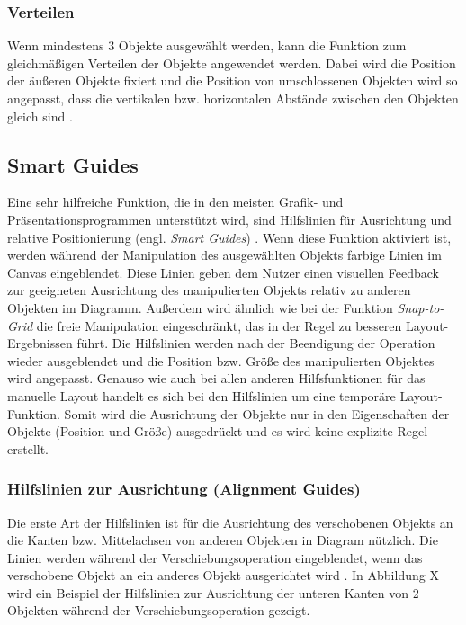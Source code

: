 
\subsubsection{Verteilen}

Wenn mindestens 3 Objekte ausgewählt werden, kann die Funktion zum gleichmäßigen Verteilen der Objekte angewendet werden. Dabei wird die Position der äußeren Objekte fixiert und die Position von umschlossenen Objekten wird so angepasst, dass die vertikalen bzw. horizontalen Abstände zwischen den Objekten gleich sind \cite{11Keynote}.


\subsection{Smart Guides}
\label{subsec:smart-guides}

Eine sehr hilfreiche Funktion, die in den meisten Grafik- und Präsentationsprogrammen unterstützt wird, sind Hilfslinien für Ausrichtung und relative Positionierung (engl. \textit{Smart Guides}) \cite{11Keynote}. Wenn diese Funktion aktiviert ist, werden während der Manipulation des ausgewählten Objekts farbige Linien im Canvas eingeblendet. Diese Linien geben dem Nutzer einen visuellen Feedback zur geeigneten Ausrichtung des manipulierten Objekts relativ zu anderen Objekten im Diagramm. Außerdem wird ähnlich wie bei der Funktion \textit{Snap-to-Grid} die freie Manipulation eingeschränkt, das in der Regel zu besseren Layout-Ergebnissen führt. Die Hilfslinien werden nach der Beendigung der Operation wieder ausgeblendet und die Position bzw. Größe des manipulierten Objektes wird angepasst. Genauso wie auch bei allen anderen Hilfsfunktionen für das manuelle Layout handelt es sich bei den Hilfslinien um eine temporäre Layout-Funktion. Somit wird die Ausrichtung der Objekte nur in den Eigenschaften der Objekte (Position und Größe) ausgedrückt und es wird keine explizite Regel erstellt.

\subsubsection{Hilfslinien zur Ausrichtung (Alignment Guides)}

Die erste Art der Hilfslinien ist für die Ausrichtung des verschobenen Objekts an die Kanten bzw. Mittelachsen von anderen Objekten in Diagram nützlich. Die Linien werden während der Verschiebungsoperation eingeblendet, wenn das verschobene Objekt an ein anderes Objekt ausgerichtet wird \cite{11Keynote}. In Abbildung X wird ein Beispiel der Hilfslinien zur Ausrichtung der unteren Kanten von 2 Objekten während der Verschiebungsoperation gezeigt.

